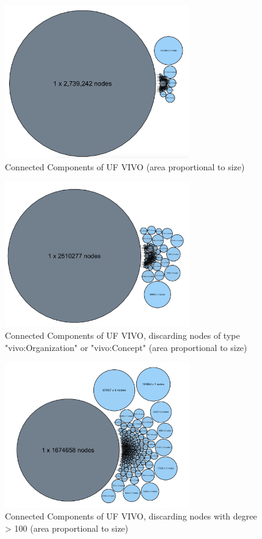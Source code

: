 \documentclass[11pt]{article}
\begin{document}
\begin{figure}[h!]
\centering
\includegraphics[width=8cm]{cc-actual.png}
\caption{Connected Components of UF VIVO (area proportional to size)}
\label{fig:output}
\end{figure}

\begin{figure}[h!]
\centering
\includegraphics[width=8cm]{cc-2.png}
\caption{Connected Components of UF VIVO, discarding nodes of type "vivo:Organization" or "vivo:Concept" (area proportional to size)}
\label{fig:output}
\end{figure}

\begin{figure}[h!]
\centering
\includegraphics[width=8cm]{cc-3.png}
\caption{Connected Components of UF VIVO, discarding nodes with degree > 100 (area proportional to size)}
\label{fig:output}
\end{figure}
\end{document}
